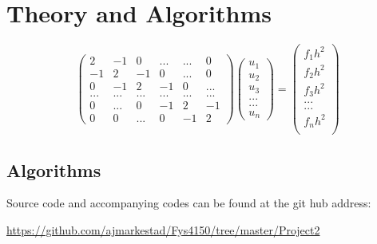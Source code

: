 \documentclass[a4paper,11pt]{article}
\begin{document}
{\section*{Theory and Algorithms}
		\begin{equation}
\begin{pmatrix}
	2 & -1 & 0 & ... & ... & 0 \\
	-1 & 2 & -1 & 0 & ... & 0 \\
	0 & -1 & 2 & -1 & 0 & ... \\
	... & ... & ... & ... & ... & ... \\
	0 & ... & 0 & -1 & 2 & -1 \\
	0 & 0 & ... & 0 & -1 & 2 
	\end{pmatrix} \begin{pmatrix}
	u_1\\
	u_2\\
	u_3\\
	...\\
	...\\
	u_n
	\end{pmatrix} = \begin{pmatrix}
	f_1 h^2 \\
	f_2 h^2 \\
	f_3 h^2 \\
	... \\
	... \\
	f_n h^2 \\
	\end{pmatrix}
\end{equation}		




\subsection{Algorithms}

Source code and accompanying codes can be found at the git hub address:

\url{https://github.com/ajmarkestad/Fys4150/tree/master/Project2} 

}
\end{document}
